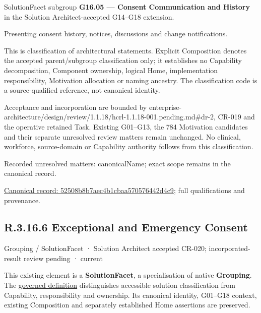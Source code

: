 SolutionFacet subgroup \textbf{G16.05 — Consent Communication and History} in the Solution Architect-accepted G14–G18 extension.



Presenting consent history, notices, discussions and change notifications.



This is classification of architectural statements. Explicit Composition denotes the accepted parent/subgroup classification only; it establishes no Capability decomposition, Component ownership, logical Home, implementation responsibility, Motivation allocation or naming ancestry. The classification code is a source-qualified reference, not canonical identity.



Acceptance and incorporation are bounded by enterprise-architecture/design/review/1.1.18/hcrl-1.1.18-001.pending.md\#dr-2, CR-019 and the operative retained Task. Existing G01–G13, the 784 Motivation candidates and their separate unresolved review matters remain unchanged. No clinical, workforce, source-domain or Capability authority follows from this classification.


{\small Recorded unresolved matters: canonicalName; exact scope remains in the canonical record.}\par
{\footnotesize \href{../../../../../../../continuum/grouping/52508b8b7aec4b1cbaa570576442d4c9.md}{Canonical record: 52508b8b7aec4b1cbaa570576442d4c9}; full qualifications and provenance.}\par
\subsection*{R.3.16.6 Exceptional and Emergency Consent}
\label{navigation:R.3.16.6}

\label{element:25bc65e773d64ecf9b71ae4f92ed57e1}
{\small Grouping / SolutionFacet · Solution Architect accepted CR-020; incorporated-result review pending · current}\par

This existing element is a \textbf{SolutionFacet}, a specialisation of native
\textbf{Grouping}. The \href{\detokenize{../../../../../../../governance/continuum-representation.md#solutionfacet-classification--1119-candidate}}{governed definition}
distinguishes accessible solution classification from Capability, responsibility
and ownership. Its canonical identity, G01–G18 context, existing Composition
and separately established Home assertions are preserved.



